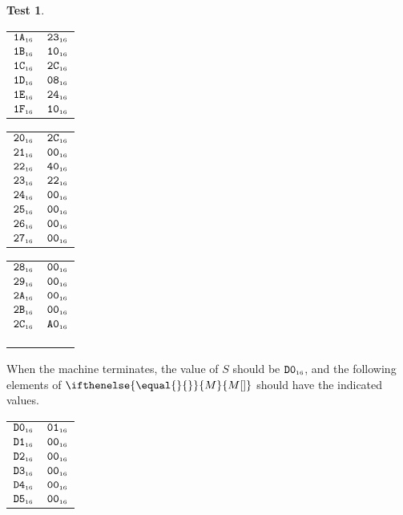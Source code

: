 \documentclass[a4paper,12pt]{article}
\makeatletter
\newcommand{\num}[1]{\texttt{#1}}
\newcommand{\hex}[1]{\num{#1}_{\textup{\tiny 16}}}
\newcommand{\MEM}[1]{\ifthenelse{\equal{#1}{}}{M}{M[#1]}}
\newcommand{\SP}{S}
\theoremstyle{definition}
\newtheorem{test}{Test}
\newenvironment{memtable}{%
  \begin{trivlist}
    \item
    }{%
    \end{trivlist}}
\newenvironment{memcolumn}{%
  \begin{tabular}{@{}ll@{}}
    \hline}
    {%
    \hline
  \end{tabular}}
\newcommand{\memspace}{\qquad}
\makeatother
\begin{document}
\begin{test}
\begin{memtable}
\begin{memcolumn}
      $\hex{1A}$ & $\hex{23}$ \\
      $\hex{1B}$ & $\hex{10}$ \\
      $\hex{1C}$ & $\hex{2C}$ \\
      $\hex{1D}$ & $\hex{08}$ \\
      $\hex{1E}$ & $\hex{24}$ \\
      $\hex{1F}$ & $\hex{10}$ \\
    \end{memcolumn}
    \memspace
    \begin{memcolumn}
      $\hex{20}$ & $\hex{2C}$ \\
      $\hex{21}$ & $\hex{00}$ \\
      $\hex{22}$ & $\hex{40}$ \\
      $\hex{23}$ & $\hex{22}$ \\
      $\hex{24}$ & $\hex{00}$ \\
      $\hex{25}$ & $\hex{00}$ \\
      $\hex{26}$ & $\hex{00}$ \\
      $\hex{27}$ & $\hex{00}$ \\
    \end{memcolumn}
    \memspace
    \begin{memcolumn}
      $\hex{28}$ & $\hex{00}$ \\
      $\hex{29}$ & $\hex{00}$ \\
      $\hex{2A}$ & $\hex{00}$ \\
      $\hex{2B}$ & $\hex{00}$ \\
      $\hex{2C}$ & $\hex{A0}$ \\
      \\
      \\
      \\
    \end{memcolumn}
  \end{memtable}
  When the machine terminates, the value of $\SP$ should be $\hex{D0}$, and the following elements of $\MEM{}$ should have the indicated values.
  \begin{memtable}
    \begin{memcolumn}
      $\hex{D0}$ & $\hex{01}$ \\
      $\hex{D1}$ & $\hex{00}$ \\
      $\hex{D2}$ & $\hex{00}$ \\
      $\hex{D3}$ & $\hex{00}$ \\
      $\hex{D4}$ & $\hex{00}$ \\
      $\hex{D5}$ & $\hex{00}$ \\

\end{memcolumn}
\end{memtable}
\end{test}
\end{document}
